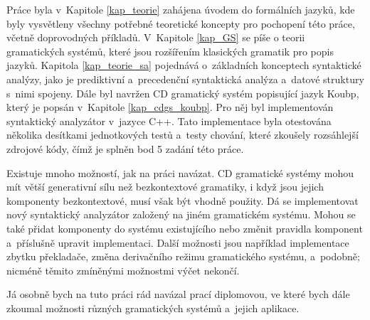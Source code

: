 Práce byla v~Kapitole \ref{kap_teorie} zahájena úvodem do formálních jazyků, kde byly vysvětleny všechny potřebné teoretické koncepty pro pochopení této práce, včetně doprovodných příkladů.
V~Kapitole \ref{kap_GS} se píše o teorii gramatických systémů, které jsou rozšířením klasických gramatik pro popis jazyků.
Kapitola \ref{kap_teorie_sa} pojednává o~základních konceptech syntaktické analýzy, jako je prediktivní a~precedenční syntaktická analýza a~datové struktury s~nimi spojeny.
Dále byl navržen CD gramatický systém popisující jazyk Koubp, který je popsán v~Kapitole \ref{kap_cdgs_koubp}. Pro něj byl implementován syntaktický analyzátor v~jazyce C++.
Tato implementace byla otestována několika desítkami jednotkových testů a~testy chování, které zkoušely rozsáhlejší zdrojové kódy, čímž je splněn bod 5 zadání této práce.

Existuje mnoho možností, jak na práci navázat.
CD gramatické systémy mohou mít větší generativní sílu než bezkontextové gramatiky, i když jsou jejich komponenty bezkontextové, musí však být vhodně použity.
Dá se implementovat nový syntaktický analyzátor založený na jiném gramatickém systému.
Mohou se také přidat komponenty do systému existujícího nebo změnit pravidla komponent a~příslušně upravit implementaci.
Další možnosti jsou například implementace zbytku překladače, změna derivačního režimu gramatického systému, a~podobně; nicméně těmito zmíněnými možnostmi výčet nekončí.

Já osobně bych na tuto práci rád navázal prací diplomovou, ve které bych dále zkoumal možnosti různých gramatických systémů a~jejich aplikace.
